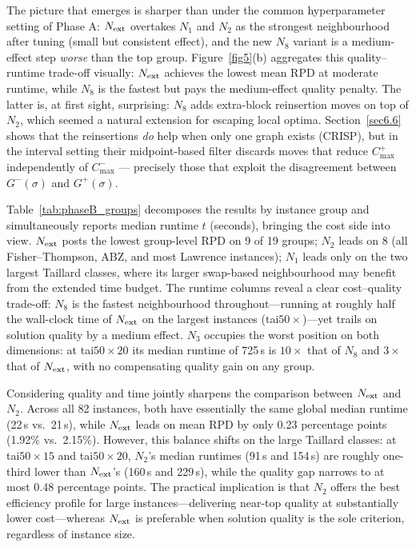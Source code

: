 \documentclass[preprint,12pt]{elsarticle}
\begin{document}
The picture that emerges is sharper than under the common hyperparameter setting of Phase A: $N_{\rm ext}$ overtakes $N_1$ and $N_2$ as the strongest neighbourhood after tuning (small but consistent effect), and the new $N_8$ variant is a medium-effect step \emph{worse} than the top group. Figure~\ref{fig5}(b) aggregates this quality--runtime trade-off visually: $N_{\rm ext}$ achieves the lowest mean RPD at moderate runtime, while $N_8$ is the fastest but pays the medium-effect quality penalty. The latter is, at first sight, surprising: $N_8$ adds extra-block reinsertion moves on top of $N_2$, which seemed a natural extension for escaping local optima. Section~\ref{sec6.6} shows that the reinsertions \emph{do} help when only one graph exists (CRISP), but in the interval setting their midpoint-based filter discards moves that reduce $C^+_{\max}$ independently of $C^-_{\max}$ --- precisely those that exploit the disagreement between $G^-(\sigma)$ and $G^+(\sigma)$.

Table~\ref{tab:phaseB_groups} decomposes the results by instance group and simultaneously reports median runtime $t$ (seconds), bringing the cost side into view. $N_{\rm ext}$ posts the lowest group-level RPD on 9 of 19 groups; $N_2$ leads on 8 (all Fisher--Thompson, ABZ, and most Lawrence instances); $N_1$ leads only on the two largest Taillard classes, where its larger swap-based neighbourhood may benefit from the extended time budget. The runtime columns reveal a clear cost--quality trade-off: $N_8$ is the fastest neighbourhood throughout---running at roughly half the wall-clock time of $N_{\rm ext}$ on the largest instances (tai$50{\times}$)---yet trails on solution quality by a medium effect. $N_3$ occupies the worst position on both dimensions: at tai$50{\times}20$ its median runtime of 725\,s is $10{\times}$ that of $N_8$ and $3{\times}$ that of $N_{\rm ext}$, with no compensating quality gain on any group.

Considering quality and time jointly sharpens the comparison between $N_{\rm ext}$ and $N_2$. Across all 82 instances, both have essentially the same global median runtime (22\,s vs.\ 21\,s), while $N_{\rm ext}$ leads on mean RPD by only 0.23 percentage points (1.92\% vs.\ 2.15\%). However, this balance shifts on the large Taillard classes: at tai$50{\times}15$ and tai$50{\times}20$, $N_2$'s median runtimes (91\,s and 154\,s) are roughly one-third lower than $N_{\rm ext}$'s (160\,s and 229\,s), while the quality gap narrows to at most 0.48 percentage points. The practical implication is that $N_2$ offers the best efficiency profile for large instances---delivering near-top quality at substantially lower cost---whereas $N_{\rm ext}$ is preferable when solution quality is the sole criterion, regardless of instance size.
\end{document}
